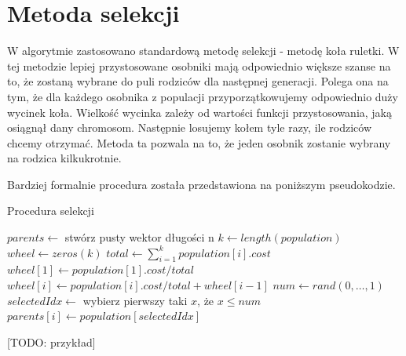 \section{Metoda selekcji}
W algorytmie zastosowano standardową metodę selekcji - metodę koła ruletki. W tej metodzie lepiej przystosowane osobniki mają odpowiednio większe 
szanse na to, że zostaną wybrane do puli rodziców dla następnej generacji. Polega ona na tym, że dla każdego osobnika z populacji 
przyporzątkowujemy odpowiednio duży wycinek koła. Wielkość wycinka zależy od wartości funkcji przystosowania, jaką osiągnął dany chromosom. 
Następnie losujemy kołem tyle razy, ile rodziców chcemy otrzymać. Metoda ta pozwala na to, że jeden osobnik zostanie wybrany na rodzica kilkukrotnie.

Bardziej formalnie procedura została przedstawiona na poniższym pseudokodzie.

\begin{pseudokod}[H]
    \label{selekcja}
    \caption{Procedura selekcji}
    \BlankLine
    $parents \gets$ stwórz pusty wektor długości n\;
    $k \gets length(population)$\;
    $wheel \gets zeros(k)$
    \BlankLine
    $total \gets \sum_{i=1}^{k} population[i].cost$\;
    $wheel[1] \gets population[1].cost / total$\;
     {
        $wheel[i] \gets population[i].cost / total + wheel[i-1]$\;
    }
    \BlankLine
     {
        $num \gets rand(0,\dots, 1)$
        $selectedIdx \gets$ wybierz pierwszy taki $x$, że $x \le num$\;
        $parents[i] \gets population[selectedIdx]$\;
    }

\end{pseudokod}


[TODO: przykład]

